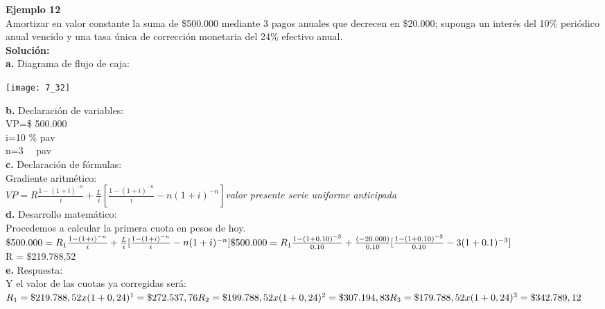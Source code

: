 \textbf{Ejemplo 12}\\
Amortizar en valor constante la suma de \$500.000 mediante 3 pagos anuales que decrecen en \$20.000; suponga un interés del 10\% periódico anual vencido  y una tasa única de corrección monetaria del 24\% efectivo anual.\\

\textbf{Solución:}\\
\textbf{a.}	Diagrama de flujo de caja:
\begin{center}
	\texttt{[image: 7\_32]}
\end{center}
\textbf{b.}	Declaración de variables:\\


	VP=\$ 500.000\\
	i=10 \% pav\\
	n=3 \ \ pav\\
	

\textbf{c.}	Declaración de fórmulas:\\
Gradiente aritmético:\\


	$VP =R \frac{1-(1+i)^{-n}}{i}+\frac{L}{i} [\frac{1-(1+i)^{-n}}{i}-n(1+i)^{-n} ]$\hspace{25pt}\textit{valor presente serie uniforme anticipada}\\

\textbf{d.}	Desarrollo matemático:\\
Procedemos a calcular la primera cuota en pesos de hoy.\\


	$\$ 500.000=R_{1}  \frac{1-(1+i)^{-n}}{i}+\frac{L}{i} [\frac{1-(1+i)^{-n}}{i}-n(1+i)^{-n} ]\\
	\$ 500.000=R_{1} \frac{1-(1+0.10)^{-3}}{0.10}+\frac{(-20.000)}{0.10} [\frac{1-(1+0.10)^{-3}}{0.10}-3(1+0.1)^{-3}]$\\
	


	R = \$219.788,52\\

\textbf{e.}	Respuesta:\\
Y el valor de las cuotas ya corregidas será:\\


	$R_{1} =\$219.788,52 x (1+0,24)^{1} = \$272.537,76\\
	R_{2} =\$199.788,52 x (1 +0,24)^{2}  = \$307.194,83\\ 
	R_{3}=\$179.788,52 x (1 +0,24)^{3}= \$342.789,12$\\



